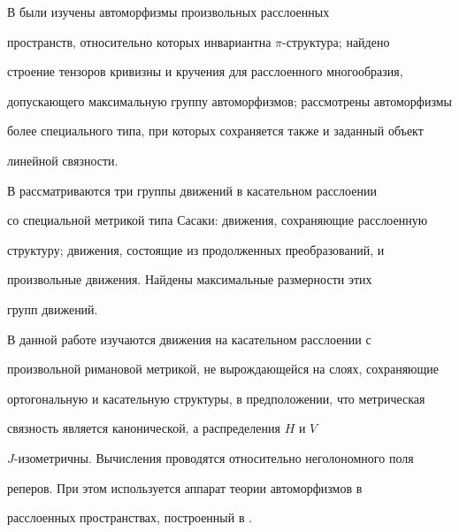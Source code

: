 \pagestyle{plain} %













\maketitle


\label{begin}





В \cite{1} были изучены автоморфизмы произвольных расслоенных


пространств, относительно которых инвариантна $\pi$-структура; найдено


строение тензоров кривизны и кручения для расслоенного многообразия,


допускающего максимальную группу автоморфизмов; рассмотрены автоморфизмы


более специального типа, при которых сохраняется также и заданный объект


линейной связности.


В \cite{2} рассматриваются три группы движений в касательном расслоении


со специальной метрикой типа Сасаки: движения, сохраняющие расслоенную


структуру; движения, состоящие из продолженных преобразований, и


произвольные движения. Найдены максимальные размерности этих


групп движений.





В данной работе изучаются движения на касательном расслоении с


произвольной римановой метрикой, не вырождающейся на слоях, сохраняющие


ортогональную и касательную структуры, в предположении, что метрическая


связность является канонической, а распределения $H$ и $V$\;


$J$-изометричны. Вычисления проводятся относительно неголономного поля


реперов. При этом используется аппарат теории автоморфизмов в


расслоенных пространствах, построенный в \cite{1}.





